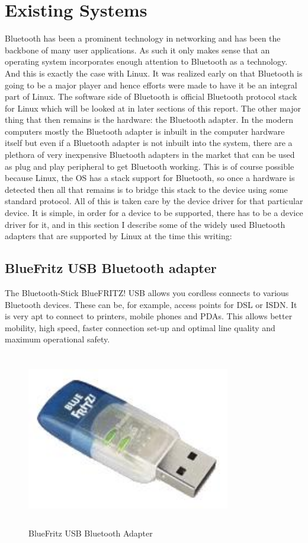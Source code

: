 \section{Existing Systems}
\noindent Bluetooth has been a prominent technology in networking and has been the backbone of many user applications. As such it only makes sense that an operating system incorporates enough attention to Bluetooth as a technology. And this is exactly the case with Linux. It was realized early on that Bluetooth is going to be a major player and hence efforts were made to have it be an integral part of Linux. The software side of Bluetooth is official Bluetooth protocol stack for Linux which will be looked at in later sections of this report. The other major thing that then remains is the hardware: the Bluetooth adapter. In the modern computers mostly the Bluetooth adapter is inbuilt in the computer hardware itself but even if a Bluetooth adapter is not inbuilt into the system, there are a plethora of very inexpensive Bluetooth adapters in the market that can be used as plug and play peripheral to get Bluetooth working. This is of course possible because Linux, the OS has a stack support for Bluetooth, so once a hardware is detected then all that remains is to bridge this stack to the device using some standard protocol. All of this is taken care by the device driver for that particular device. It is simple, in order for a device to be supported, there has to be a device driver for it, and in this section I describe some of the widely used Bluetooth adapters that are supported by Linux at the time this writing:
\subsection{BlueFritz USB Bluetooth adapter}
The Bluetooth-Stick BlueFRITZ! USB allows you cordless connects to various Bluetooth devices. These can be, for example, access points for DSL or ISDN. It is very apt to connect to printers, mobile phones and PDAs. This allows better mobility, high speed, faster connection set-up and optimal line quality and maximum operational safety.
\begin{figure}[ht]
	\centering
	\includegraphics[width=3.5in, height=3in]{images/bluefritz_usb.png}
	\caption{BlueFritz USB Bluetooth Adapter}
\end{figure}
